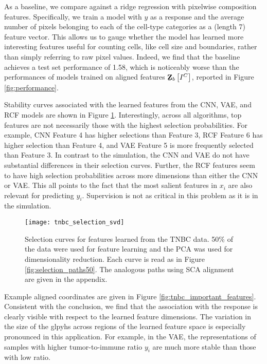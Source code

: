 As a baseline, we compare against a ridge regression with pixelwise composition
features. Specifically, we train a model with $y$ as a response and the average
number of pixels belonging to each of the cell-type categories as a (length 7)
feature vector. This allows us to gauge whether the model has learned more
interesting features useful for counting cells, like cell size and boundaries,
rather than simply referring to raw pixel values. Indeed, we find that the
baseline achieves a test set performance of 1.58, which is noticeably worse than
the performances of models trained on aligned features
$\underaccent{\bar}{\mathbf{Z}}_{b}\left[I^{C}\right]$, reported in Figure
\ref{fig:performance}.

Stability curves associated with the learned features from the CNN, VAE, and RCF
models are shown in Figure \ref{fig:tnbc_selection_svd}. Interestingly, across
all algorithms, top features are not necessarily those with the highest
selection probabilities. For example, CNN Feature 4 has higher selections than
Feature 3, RCF Feature 6 has higher selection than Feature 4, and VAE Feature 5
is more frequently selected than Feature 3. In contrast to the simulation, the
CNN and VAE do not have substantial differences in their selection curves.
Further, the RCF features seem to have high selection probabilities across more
dimensions than either the CNN or VAE. This all points to the fact that the most
salient features in $x_i$ are also relevant for predicting $y_i$. Supervision is
not as critical in this problem as it is in the simulation.

\begin{figure}
  \centering
  \texttt{[image: tnbc\_selection\_svd]}
  \caption{Selection curves for features learned from the TNBC data. 50\% of
    the data were used for feature learning and the PCA was used for
    dimensionality reduction. Each curve is read as in Figure
    \ref{fig:selection_paths50}. The analogous paths using SCA alignment are
    given in the appendix. }
  \label{fig:tnbc_selection_svd}
\end{figure}

Example aligned coordinates are given in Figure
\ref{fig:tnbc_important_features}. Consistent with the conclusion, we find that
the association with the response is clearly visible with respect to the learned
feature dimensions. The variation in the size of the glpyhs across regions of
the learned feature space is especially pronounced in this application. For
example, in the VAE, the representations of samples with higher tumor-to-immune
ratio $y_i$ are much more stable than those with low ratio.

